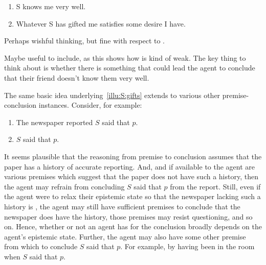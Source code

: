 \begin{note}[Gifts]
  \begin{illustration}
    \label{illu:S:gifts}
    \begin{enumerate}
    \item S knows me very well.
    \item Whatever S has gifted me satisfies some desire I have.
    \end{enumerate}
  \end{illustration}
  Perhaps wishful thinking, but fine with respect to \zS{}.

  {
    \color{red}
    Maybe useful to include, as this shows how \zS{} is kind of weak.
    The key thing to think about is whether there is something that could lead the agent to conclude that their friend doesn't know them very well.
  }

  The same basic idea underlying~\autoref{illu:S:gifts} extends to various other premise-conclusion instances.
  Consider, for example:

  \begin{enumerate}
  \item The newspaper reported \(S\) said that \(p\).
  \item \(S\) said that \(p\).
  \end{enumerate}

  It seems plausible that the reasoning from premise to conclusion assumes that the paper has a history of accurate reporting.
  And, and if available to the agent are various premises which suggest that the paper does not have such a history, then the agent may refrain from concluding \(S\) said that \(p\) from the report.
  Still, even if the agent were to relax their epistemic state so that the newspaper lacking such a history is \epVAd{}, the agent may still have sufficient premises to conclude that the newspaper does have the history, those premises may resist questioning, and so on.
  Hence, whether or not an agent has \support{} for the conclusion broadly depends on the agent's epistemic state.
  Further, the agent may also have some other premise from which to conclude \(S\) said that \(p\).
  For example, by having been in the room when \(S\) said that \(p\).
\end{note}

